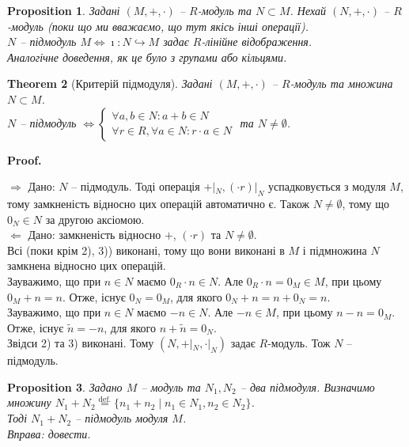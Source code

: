 \documentclass[a4paper, 10pt]{article}
\makeatletter
\def\rightproof{$\boxed{\Rightarrow}$ }
\def\leftproof{$\boxed{\Leftarrow}$ }
\theoremstyle{theoremdd}
\newtheorem{theorem}{Theorem}[subsection]
\theoremstyle{theoremdd}
\theoremstyle{theoremdd}
\theoremstyle{theoremdd}
\theoremstyle{theoremdd}
\theoremstyle{theoremdd}
\theoremstyle{theoremdd}
\theoremstyle{theoremdd}
\theoremstyle{theoremdd}
\newtheorem{proposition}[theorem]{Proposition}
\theoremstyle{theoremdd}
\theoremstyle{theoremdd}
\theoremstyle{theoremdd}
\theoremstyle{theoremdd}
\theoremstyle{theoremdd}
\theoremstyle{theoremdd}
\renewenvironment{proof}[1][Proof.\\]{\par
\pushQED{\hfill \qed}%
\normalfont \topsep6\p@\@plus6\p@\relax
\trivlist
\item\relax
{\bfseries
#1\@addpunct{.}}\hspace\labelsep\ignorespaces
}{%
\popQED\endtrivlist\@endpefalse
}
\newcommand{\eqbydef}{\overset{\text{def.}}{=}}
\makeatother
\begin{document}
\begin{proposition}
Задані $(M,+,\cdot)$ -- $R$-модуль та $N \subset M$. Нехай $(N,+,\cdot)$ -- $R$-модуль (поки що ми вважаємо, що тут якісь інші операції).\\
$N$ -- підмодуль $M \iff \imath \colon N \hookrightarrow M$ задає $R$-лінійне відображення.\\
\textit{Аналогічне доведення, як це було з групами або кільцями.}
\end{proposition}

\begin{theorem}[Критерій підмодуля]
Задані $(M,+,\cdot)$ -- $R$-модуль та множина $N \subset M$.\\
$N$ -- підмодуль $\iff \begin{cases} \forall a,b \in N: a+b \in N \\ \forall r \in R, \forall a \in N: r \cdot a \in N \end{cases}$ та $N \neq \emptyset$.
\end{theorem}

\begin{proof}
\rightproof Дано: $N$ -- підмодуль. Тоді операція $+|_N, (\cdot r)|_N$ успадковується з модуля $M$, тому замкненість відносно цих операцій автоматично є. Також $N \neq \emptyset$, тому що $0_N \in N$ за другою аксіомою.
\bigskip \\
\leftproof Дано: замкненість відносно $+$, $(\cdot r)$ та $N \neq \emptyset$.\\
Всі (поки крім 2), 3)) виконані, тому що вони виконані в $M$ і підмножина $N$ замкнена відносно цих операцій.\\
Зауважимо, що при $n \in N$ маємо $0_R \cdot n \in N$. Але $0_R \cdot n = 0_M \in M$, при цьому $0_M + n = n$. Отже, існує $0_N = 0_M$, для якого $0_N + n = n + 0_N = n$.\\
Зауважимо, що при $n \in N$ маємо $-n \in N$. Але $-n \in M$, при цьому $n - n = 0_M$. Отже, існує $\tilde{n} = -n$, для якого $n + \tilde{n} = 0_N$.\\
Звідси 2) та 3) виконані. Тому $(N,+|_N, \cdot|_N)$ задає $R$-модуль. Тож $N$ -- підмодуль.
\end{proof}

\begin{proposition}
Задано $M$ -- модуль та $N_1,N_2$ -- два підмодуля. Визначимо множину $N_1 + N_2 \eqbydef \{n_1 + n_2 \mid n_1 \in N_1, n_2 \in N_2\}$.\\
Тоді $N_1+N_2$ -- підмодуль модуля $M$.\\
\textit{Вправа: довести.}
\end{proposition}
\end{document}
